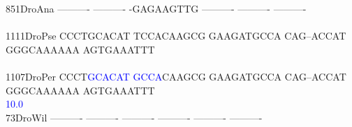 \documentclass[11pt,twoside,reqno,a4paper]{article}
\begin{document}
{851\hspace*{2\charwidth}DroAna	----------	----------	-GAGAAGTTG	----------	----------	----------	\\
\hspace*{5\charwidth}\hspace*{7\charwidth}\hspace*{1\charwidth}\hspace*{1\charwidth}\hspace*{1\charwidth}\hspace*{1\charwidth}\hspace*{1\charwidth}\hspace*{1\charwidth}\\
1111\hspace*{1\charwidth}DroPse	CCCTGCACAT	TCCACAAGCG	GAAGATGCCA	CAG--ACCAT	GGGCAAAAAA	AGTGAAATTT	\\
\hspace*{5\charwidth}\hspace*{7\charwidth}\hspace*{1\charwidth}\hspace*{1\charwidth}\hspace*{1\charwidth}\hspace*{1\charwidth}\hspace*{1\charwidth}\hspace*{1\charwidth}\\
1107\hspace*{1\charwidth}DroPer	CCCT\textcolor{blue}{G}\textcolor{blue}{C}\textcolor{blue}{A}\textcolor{blue}{C}\textcolor{blue}{A}\textcolor{blue}{T}	\textcolor{blue}{G}\textcolor{blue}{C}\textcolor{blue}{C}\textcolor{blue}{A}CAAGCG	GAAGATGCCA	CAG--ACCAT	GGGCAAAAAA	AGTGAAATTT	\\
\hspace*{5\charwidth}\hspace*{7\charwidth}\hspace*{4\charwidth}\textcolor{blue}{10.0}\hspace*{1\charwidth}\hspace*{1\charwidth}\hspace*{1\charwidth}\hspace*{1\charwidth}\hspace*{1\charwidth}\hspace*{1\charwidth}\\
73\hspace*{3\charwidth}DroWil	----------	----------	----------	----------	----------	----------	\\
\hspace*{5\charwidth}\hspace*{7\charwidth}\hspace*{1\charwidth}\hspace*{1\charwidth}\hspace*{1\charwidth}\hspace*{1\charwidth}\hspace*{1\charwidth}\hspace*{1\charwidth}\\
}
\end{document}
